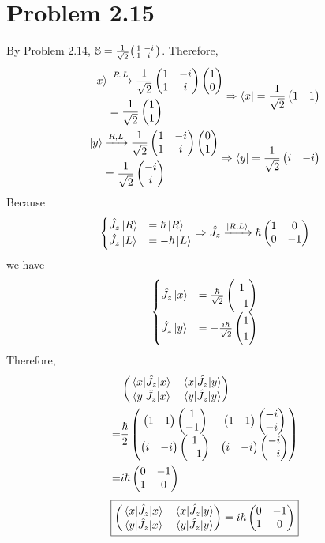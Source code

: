 \documentclass{article}
\begin{document}
\section*{Problem 2.15}
By Problem 2.14, $\mathbb{S} = \frac{1}{\sqrt{2}} \spmqty{1 & -i \\ 1 & i}$. Therefore,
\begin{align*}
  \begin{split}
    \ket{x} &\xrightarrow{R, L} \frac{1}{\sqrt{2}} \pmqty{1 & -i \\ 1 & i} \pmqty{1 \\ 0} \\
    &= \frac{1}{\sqrt{2}} \pmqty{1 \\ 1} 
  \end{split}
  \Rightarrow \bra{x} = \frac{1}{\sqrt{2}} \pmqty{1 & 1} \\
  \begin{split}
    \ket{y} &\xrightarrow{R, L} \frac{1}{\sqrt{2}} \pmqty{1 & -i \\ 1 & i} \pmqty{0 \\ 1} \\
    &= \frac{1}{\sqrt{2}} \pmqty{-i \\ i} 
  \end{split}
  \Rightarrow \bra{y} = \frac{1}{\sqrt{2}} \pmqty{i & -i}
\end{align*}
Because
\[ 
  \begin{cases}
    \hat{J_z} \ket{R} &= \hbar \ket{R} \\
    \hat{J_z} \ket{L} &= -\hbar \ket{L}
  \end{cases}
  \Rightarrow \hat{J_z} \xrightarrow{\ket{R, L}} \hbar \pmqty{1 & 0 \\ 0 & -1}
\]
we have 
\[ 
  \begin{cases}
    \hat{J_z} \ket{x} &= \frac{\hbar}{\sqrt{2}} \pmqty{1 \\ -1} \\
    \hat{J_z} \ket{y} &= -\frac{i\hbar}{\sqrt{2}} \pmqty{1 \\ 1}
  \end{cases}
\]
Therefore,
\[ 
  \begin{split}
    &\pmqty{\mel{x}{\hat{J_z}}{x} & \mel{x}{\hat{J_z}}{y} \\ \mel{y}{\hat{J_z}}{x} & \mel{y}{\hat{J_z}}{y}} \\
    =& \frac{\hbar}{2} \pmqty{\pmqty{1 & 1}\pmqty{1 \\ -1} & \pmqty{1 & 1} \pmqty{-i \\ -i} \\ \pmqty{i & -i}\pmqty{1 \\ -1} & \pmqty{i & -i}\pmqty{-i \\ -i}} \\
    =& i\hbar \pmqty{\admat[0]{-1, 1}}
  \end{split}
\]
\[ 
  \boxed{
    \pmqty{\mel{x}{\hat{J_z}}{x} & \mel{x}{\hat{J_z}}{y} \\ \mel{y}{\hat{J_z}}{x} & \mel{y}{\hat{J_z}}{y}} = i\hbar \pmqty{\admat[0]{-1, 1}}
  }
\]
\end{document}
